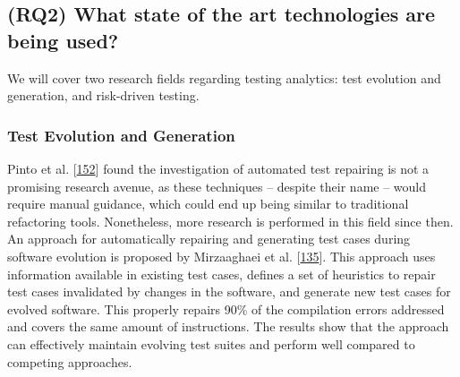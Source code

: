 \documentclass[]{book}
\begin{document}
\subsection{(RQ2) What state of the art technologies are being
used?}\label{rq2-what-state-of-the-art-technologies-are-being-used}

We will cover two research fields regarding testing analytics: test
evolution and generation, and risk-driven testing.

\subsubsection{Test Evolution and
Generation}\label{test-evolution-and-generation}

Pinto et al. {[}\protect\hyperlink{ref-pinto2012understanding}{152}{]}
found the investigation of automated test repairing is not a promising
research avenue, as these techniques -- despite their name -- would
require manual guidance, which could end up being similar to traditional
refactoring tools. Nonetheless, more research is performed in this field
since then. An approach for automatically repairing and generating test
cases during software evolution is proposed by Mirzaaghaei et al.
{[}\protect\hyperlink{ref-supportingtestsuite}{135}{]}. This approach
uses information available in existing test cases, defines a set of
heuristics to repair test cases invalidated by changes in the software,
and generate new test cases for evolved software. This properly repairs
90\% of the compilation errors addressed and covers the same amount of
instructions. The results show that the approach can effectively
maintain evolving test suites and perform well compared to competing
approaches.
\end{document}
